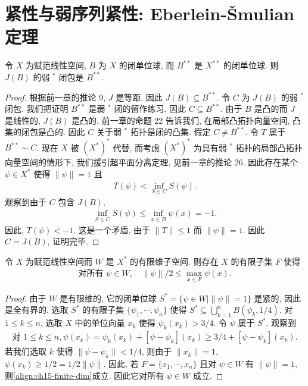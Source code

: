 \documentclass[../../main.tex]{subfiles}
\begin{document}
\section{紧性与弱序列紧性: Eberlein-\v{S}mulian 定理}\label{section:ch15-eberlein-smulian}

\begin{theorem}[Goldstine]\label{theorem:ch15-goldstine}
令 $X$ 为赋范线性空间, $B$ 为 $X$ 的闭单位球, 而 $B^{**}$ 是 $X^{**}$ 的闭单位球. 则 $J(B)$ 的弱 $^{*}$ 闭包是 $B^{**}$.
\end{theorem}

\begin{proof}
根据前一章的推论 9, $J$ 是等距. 因此 $J(B)\subseteq B^{**}$. 令 $C$ 为 $J(B)$ 的弱 $^{*}$ 闭包. 我们把证明 $B^{**}$ 是弱 $^{*}$ 闭的留作练习. 因此 $C\subseteq B^{**}$. 由于 $B$ 是凸的而 $J$ 是线性的, $J(B)$ 是凸的. 前一章的命题 22 告诉我们, 在局部凸拓扑向量空间, 凸集的闭包是凸的. 因此 $C$ 关于弱 $^{*}$ 拓扑是闭的凸集. 假定 $C\neq B^{**}$. 令 $T$ 属于 $B^{**}\sim C$. 现在 $X$ 被 $(X^{*})^{*}$ 代替, 而考虑 $(X^{*})^{*}$ 为具有弱 $^{*}$ 拓扑的局部凸拓扑向量空间的情形下, 我们援引超平面分离定理, 见前一章的推论 26. 因此存在某个 $\psi\in X^{*}$ 使得 $\|\psi\|=1$ 且
\begin{align}
T(\psi)<\inf_{S\in C}S(\psi).\label{align:ch15-goldstine-sep}
\end{align}
观察到由于 $C$ 包含 $J(B)$,
\begin{align*}
\inf_{S\in C}S(\psi)\leqslant\inf_{x\in B}\psi(x)=-1.
\end{align*}
因此, $T(\psi)<-1$. 这是一个矛盾, 由于 $\|T\|\leqslant 1$ 而 $\|\psi\|=1$. 因此 $C=J(B)$, 证明完毕.
\end{proof}

\begin{lemma}\label{lemma:ch15-finite-dim-approx}
令 $X$ 为赋范线性空间而 $W$ 是 $X^{*}$ 的有限维子空间. 则存在 $X$ 的有限子集 $F$ 使得
\begin{align}
\text{对所有 }\psi\in W,\quad\|\psi\|/2\leqslant\max_{x\in F}\psi(x).\label{align:ch15-finite-dim}
\end{align}
\end{lemma}

\begin{proof}
由于 $W$ 是有限维的, 它的闭单位球 $S^{*}=\{\psi\in W\mid\|\psi\|=1\}$ 是紧的, 因此是全有界的. 选取 $S^{*}$ 的有限子集 $\{\psi_{1},\cdots,\psi_{n}\}$ 使得 $S^{*}\subseteq\bigcup_{k=1}^{n}B(\psi_{k},1/4)$. 对 $1\leqslant k\leqslant n$, 选取 $X$ 中的单位向量 $x_{k}$ 使得 $\psi_{k}(x_{k})>3/4$. 令 $\psi$ 属于 $S^{*}$. 观察到
\begin{align*}
\text{对 }1\leqslant k\leqslant n,\psi(x_{k})=\psi_{k}(x_{k})+[\psi-\psi_{k}](x_{k})\geqslant 3/4+[\psi-\psi_{k}](x_{k}).
\end{align*}
若我们选取 $k$ 使得 $\|\psi-\psi_{k}\|<1/4$, 则由于 $\|x_{k}\|=1$, $\psi(x_{k})\geqslant 1/2=1/2\|\psi\|$. 因此, 若 $F=\{x_{1},\cdots,x_{n}\}$ 且对 $\psi\in W$ 有 $\|\psi\|=1$, 则\eqref{align:ch15-finite-dim}成立. 因此它对所有 $\psi\in W$ 成立.
\end{proof}
\end{document}
